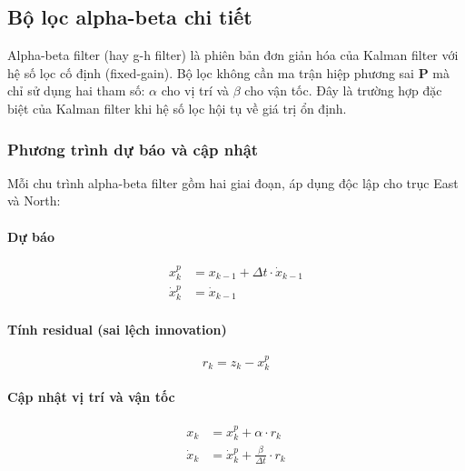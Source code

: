 \subsection{Bộ lọc alpha-beta chi tiết}

\hspace{0.5cm} Alpha-beta filter (hay g-h filter) là phiên bản đơn giản hóa của Kalman filter với hệ số lọc cố định (fixed-gain). Bộ lọc không cần ma trận hiệp phương sai $\mathbf{P}$ mà chỉ sử dụng hai tham số: $\alpha$ cho vị trí và $\beta$ cho vận tốc. Đây là trường hợp đặc biệt của Kalman filter khi hệ số lọc hội tụ về giá trị ổn định.

\subsubsection{Phương trình dự báo và cập nhật}

\hspace{0.5cm} Mỗi chu trình alpha-beta filter gồm hai giai đoạn, áp dụng độc lập cho trục East và North:

\paragraph{Dự báo\\}
\begin{equation}
\begin{aligned}
    x_k^p &= x_{k-1} + \Delta t \cdot \dot{x}_{k-1} \\
    \dot{x}_k^p &= \dot{x}_{k-1}
\end{aligned}
\end{equation}

\paragraph{Tính residual (sai lệch innovation)\\}
\begin{equation}
    r_k = z_k - x_k^p
\end{equation}

\paragraph{Cập nhật vị trí và vận tốc\\}
\begin{equation}
\begin{aligned}
    x_k &= x_k^p + \alpha \cdot r_k \\
    \dot{x}_k &= \dot{x}_k^p + \frac{\beta}{\Delta t} \cdot r_k
\end{aligned}
\end{equation}

